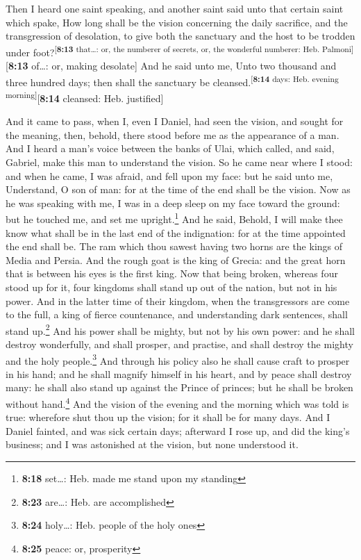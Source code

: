  Then I heard one saint speaking, and another saint said
unto that certain saint which spake, How long shall be the vision
concerning the daily sacrifice, and the transgression of desolation, to
give both the sanctuary and the host to be trodden under
foot?\textsuperscript{{[}\textbf{8:13} that\ldots: or, the numberer of
secrets, or, the wonderful numberer: Heb. Palmoni{]}}{[}\textbf{8:13}
of\ldots: or, making desolate{]}  And he said unto me,
Unto two thousand and three hundred days; then shall the sanctuary be
cleansed.\textsuperscript{{[}\textbf{8:14} days: Heb. evening
morning{]}}{[}\textbf{8:14} cleansed: Heb. justified{]}

 And it came to pass, when I, even I Daniel, had seen the
vision, and sought for the meaning, then, behold, there stood before me
as the appearance of a man.  And I heard a man's voice
between the banks of Ulai, which called, and said, Gabriel, make this
man to understand the vision.  So he came near where I
stood: and when he came, I was afraid, and fell upon my face: but he
said unto me, Understand, O son of man: for at the time of the end shall
be the vision.  Now as he was speaking with me, I was in
a deep sleep on my face toward the ground: but he touched me, and set me
upright.\footnote{\textbf{8:18} set\ldots: Heb. made me stand upon my
  standing}  And he said, Behold, I will make thee know
what shall be in the last end of the indignation: for at the time
appointed the end shall be.  The ram which thou sawest
having two horns are the kings of Media and Persia.  And
the rough goat is the king of Grecia: and the great horn that is between
his eyes is the first king.  Now that being broken,
whereas four stood up for it, four kingdoms shall stand up out of the
nation, but not in his power.  And in the latter time of
their kingdom, when the transgressors are come to the full, a king of
fierce countenance, and understanding dark sentences, shall stand
up.\footnote{\textbf{8:23} are\ldots: Heb. are accomplished}
 And his power shall be mighty, but not by his own power:
and he shall destroy wonderfully, and shall prosper, and practise, and
shall destroy the mighty and the holy people.\footnote{\textbf{8:24}
  holy\ldots: Heb. people of the holy ones}  And through
his policy also he shall cause craft to prosper in his hand; and he
shall magnify himself in his heart, and by peace shall destroy many: he
shall also stand up against the Prince of princes; but he shall be
broken without hand.\footnote{\textbf{8:25} peace: or, prosperity}
 And the vision of the evening and the morning which was
told is true: wherefore shut thou up the vision; for it shall be for
many days.  And I Daniel fainted, and was sick certain
days; afterward I rose up, and did the king's business; and I was
astonished at the vision, but none understood it.

